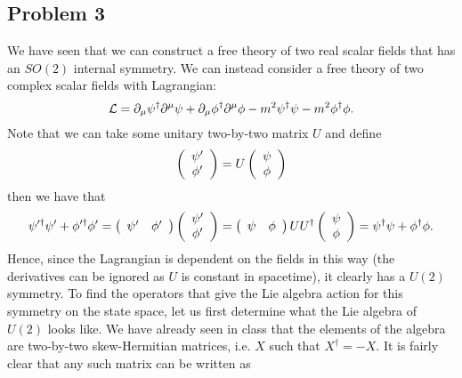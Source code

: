 \documentclass{../mathnotes}
\begin{document}
\subsection*{Problem 3}

We have seen that we can construct a free theory of two real scalar fields that has an $SO(2)$ internal symmetry.
We can instead consider a free theory of two complex scalar fields with Lagrangian:
\[\mathcal{L}=\partial_\mu\psi^\dagger\partial^\mu\psi+\partial_\mu\phi^\dagger\partial^\mu\phi-m^2\psi^\dagger\psi-m^2\phi^\dagger\phi.\]
Note that we can take some unitary two-by-two matrix $U$ and define
\begin{align*}
    \left(
    \begin{array}[]{c}
        \psi' \\
        \phi'
    \end{array}
    \right)
    =
    U
    \left(
    \begin{array}[]{c}
        \psi \\
        \phi
    \end{array}
    \right)
\end{align*}
then we have that
\begin{align*}
    \psi'^\dagger\psi'+\phi'^\dagger\phi'
    =
    \left(\begin{array}[]{cc}
        \psi' & \phi'
    \end{array}\right)
    \left( 
    \begin{array}[]{c}
        \psi'\\
        \phi'
    \end{array}
    \right)
    =
    \left(\begin{array}[]{cc}
        \psi & \phi
    \end{array}\right)
    U U^\dagger
    \left( 
    \begin{array}[]{c}
        \psi\\
        \phi
    \end{array}
    \right)
    =\psi^\dagger\psi+\phi^\dagger\phi.
\end{align*}
Hence, since the Lagrangian is dependent on the fields in this way (the derivatives can be ignored as $U$ is constant in spacetime),
it clearly has a $U(2)$ symmetry. To find the operators that give the Lie algebra action for this symmetry on the state space,
let us first determine what the Lie algebra of $U(2)$ looks like. We have already seen in class that the elements of the algebra
are two-by-two skew-Hermitian matrices, i.e. $X$ such that $X^\dagger=-X$. It is fairly clear that any such matrix can be written as
\end{document}
